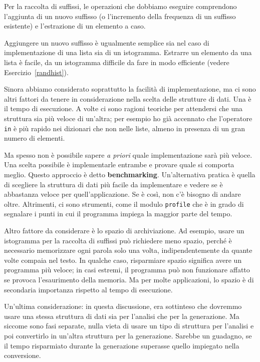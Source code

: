 \documentclass[10pt]{book}
\begin{document}
Per la raccolta di suffissi, le operazioni che dobbiamo eseguire comprendono l'aggiunta di un nuovo suffisso (o l'incremento della frequenza di un suffisso esistente) e l'estrazione di un elemento a caso.

Aggiungere un nuovo suffisso è ugualmente semplice sia nel caso di implementazione di una lista sia di un istogramma. Estrarre un elemento da una lista è facile, da un istogramma difficile da fare in modo efficiente (vedere Esercizio~\ref{randhist}).

Sinora abbiamo considerato soprattutto la facilità di implementazione, ma ci sono altri fattori da tenere in considerazione nella scelta delle strutture di dati. Una è il tempo di esecuzione. A volte ci sono ragioni teoriche per attendersi che una struttura sia più veloce di un'altra; per esempio ho già accennato che l'operatore {\tt in} è più rapido nei dizionari che non nelle liste, almeno in presenza di un gran numero di elementi.

Ma spesso non è possibile sapere {\em a priori} quale implementazione sarà più veloce. Una scelta possibile è implementarle entrambe e provare quale si comporta meglio. Questo approccio è detto {\bf benchmarking}.  Un'alternativa pratica è quella di scegliere la struttura di dati più facile da implementare e vedere se è abbastanza veloce per quell'applicazione. Se è così, non c'è bisogno di andare oltre. Altrimenti, ci sono strumenti, come il modulo {\tt profile} che è in grado di segnalare i punti in cui il programma impiega la maggior parte del tempo.

Altro fattore da considerare è lo spazio di archiviazione. Ad esempio, usare un istogramma per la raccolta di suffissi può richiedere meno spazio, perché è necessario memorizzare ogni parola solo una volta, indipendentemente da quante volte compaia nel testo. In qualche caso, risparmiare spazio significa avere un programma più veloce; in casi estremi, il programma può non funzionare affatto se provoca l'esaurimento della memoria. Ma per molte applicazioni, lo spazio è di secondaria importanza rispetto al tempo di esecuzione.

Un'ultima considerazione: in questa discussione, era sottinteso che dovremmo usare una stessa struttura di dati sia per l'analisi che per la generazione. Ma siccome sono fasi separate, nulla vieta di usare un tipo di struttura per l'analisi e poi convertirlo in un'altra struttura per la generazione. Sarebbe un guadagno, se il tempo risparmiato durante la generazione superasse quello impiegato nella conversione.
\end{document}
